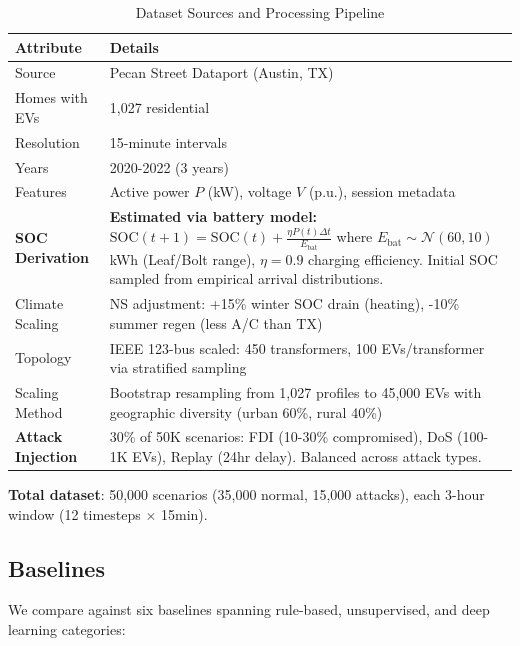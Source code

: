 \documentclass[journal]{IEEEtran}
\begin{document}
\begin{table}[t]
\caption{Dataset Sources and Processing Pipeline}
\label{tab:dataset}
\centering
\small
\begin{tabular}{p{2.5cm}p{4.5cm}}
\toprule
\textbf{Attribute} & \textbf{Details} \\
\midrule
Source & Pecan Street Dataport (Austin, TX) \\
Homes with EVs & 1,027 residential \\
Resolution & 15-minute intervals \\
Years & 2020-2022 (3 years) \\
Features & Active power $P$ (kW), voltage $V$ (p.u.), session metadata \\
\midrule
\textbf{SOC Derivation} & \textbf{Estimated via battery model:} $\text{SOC}(t+1) = \text{SOC}(t) + \frac{\eta P(t) \Delta t}{E_{\text{bat}}}$ where $E_{\text{bat}} \sim \mathcal{N}(60, 10)$ kWh (Leaf/Bolt range), $\eta=0.9$ charging efficiency. Initial SOC sampled from empirical arrival distributions. \\
\midrule
Climate Scaling & NS adjustment: +15\% winter SOC drain (heating), -10\% summer regen (less A/C than TX) \\
Topology & IEEE 123-bus scaled: 450 transformers, 100 EVs/transformer via stratified sampling \\
Scaling Method & Bootstrap resampling from 1,027 profiles to 45,000 EVs with geographic diversity (urban 60\%, rural 40\%) \\
\midrule
\textbf{Attack Injection} & 30\% of 50K scenarios: FDI (10-30\% compromised), DoS (100-1K EVs), Replay (24hr delay). Balanced across attack types. \\
\bottomrule
\end{tabular}
\end{table}

\textbf{Total dataset}: 50,000 scenarios (35,000 normal, 15,000 attacks), each 3-hour window (12 timesteps $\times$ 15min).

\subsection{Baselines}

We compare against six baselines spanning rule-based, unsupervised, and deep learning categories:
\end{document}
